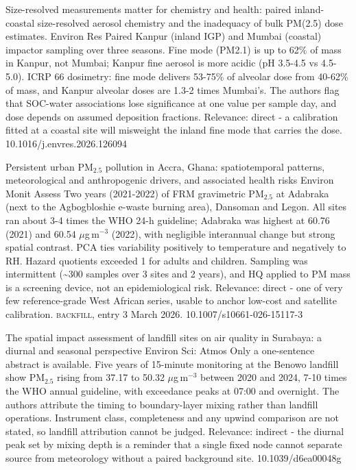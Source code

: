 \documentclass[10pt]{article}
\begin{document}
{Size-resolved measurements matter for chemistry and health: paired inland-coastal size-resolved aerosol chemistry and the inadequacy of bulk PM(2.5) dose estimates.}
{Environ Res}
{Paired Kanpur (inland IGP) and Mumbai (coastal) impactor sampling over three seasons. Fine mode (PM2.1) is up to 62\% of mass in Kanpur, not Mumbai; Kanpur fine aerosol is more acidic (pH 3.5-4.5 vs 4.5-5.0). ICRP 66 dosimetry: fine mode delivers 53-75\% of alveolar dose from 40-62\% of mass, and Kanpur alveolar doses are 1.3-2 times Mumbai's. The authors flag that SOC-water associations lose significance at one value per sample day, and dose depends on assumed deposition fractions. Relevance: direct - a calibration fitted at a coastal site will misweight the inland fine mode that carries the dose.}
{10.1016/j.envres.2026.126094}

{Persistent urban PM$_{2.5}$ pollution in Accra, Ghana: spatiotemporal patterns, meteorological and anthropogenic drivers, and associated health risks}
{Environ Monit Assess}
{Two years (2021-2022) of FRM gravimetric PM$_{2.5}$ at Adabraka (next to the Agbogbloshie e-waste burning area), Dansoman and Legon. All sites ran about 3-4 times the WHO 24-h guideline; Adabraka was highest at 60.76 (2021) and 60.54 $\mu$g\,m$^{-3}$ (2022), with negligible interannual change but strong spatial contrast. PCA ties variability positively to temperature and negatively to RH. Hazard quotients exceeded 1 for adults and children. Sampling was intermittent (\textasciitilde{}300 samples over 3 sites and 2 years), and HQ applied to PM mass is a screening device, not an epidemiological risk. Relevance: direct - one of very few reference-grade West African series, usable to anchor low-cost and satellite calibration. \textsc{backfill}, entry 3 March 2026.}
{10.1007/s10661-026-15117-3}

{The spatial impact assessment of landfill sites on air quality in Surabaya: a diurnal and seasonal perspective}
{Environ Sci: Atmos}
{Only a one-sentence abstract is available. Five years of 15-minute monitoring at the Benowo landfill show PM$_{2.5}$ rising from 37.17 to 50.32 $\mu$g\,m$^{-3}$ between 2020 and 2024, 7-10 times the WHO annual guideline, with exceedance peaks at 07:00 and overnight. The authors attribute the timing to boundary-layer mixing rather than landfill operations. Instrument class, completeness and any upwind comparison are not stated, so landfill attribution cannot be judged. Relevance: indirect - the diurnal peak set by mixing depth is a reminder that a single fixed node cannot separate source from meteorology without a paired background site.}
{10.1039/d6ea00048g}
\end{document}
